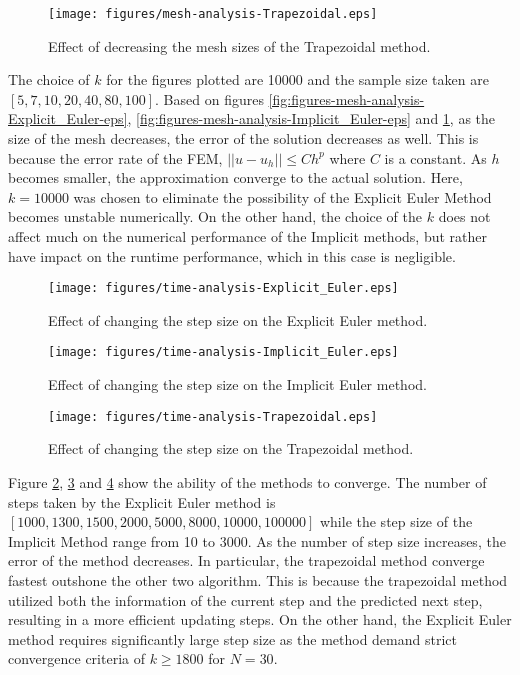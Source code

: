 \documentclass{article}
\begin{document}
\begin{figure}[H]
  \centering
  \texttt{[image: figures/mesh-analysis-Trapezoidal.eps]}
  \caption{Effect of decreasing the mesh sizes of the Trapezoidal method.}
  \label{fig:figures-mesh-analysis-Trapezoidal-eps}
\end{figure}
The choice of $k$ for the figures plotted are 10000 and the sample size taken are 
$[5, 7, 10, 20, 40, 80, 100]$. Based on figures \ref{fig:figures-mesh-analysis-Explicit_Euler-eps}, \ref{fig:figures-mesh-analysis-Implicit_Euler-eps} and \ref{fig:figures-mesh-analysis-Trapezoidal-eps},
as the size of the mesh decreases, the error of the solution decreases as well. This is because
the error rate of the FEM, $||u - u_h|| \le Ch^p$ where $C$ is a constant. As $h$ becomes 
smaller, the approximation converge to the actual solution. Here, $k=10000$ was chosen to 
eliminate the possibility of the Explicit Euler Method becomes unstable numerically. On the 
other hand, the choice of the $k$ does not affect much on the numerical performance of the 
Implicit methods, but rather have impact on the runtime performance, which in this case is 
negligible.



\begin{figure}[H]
  \centering
  \texttt{[image: figures/time-analysis-Explicit\_Euler.eps]}
  \caption{Effect of changing the step size on the Explicit Euler method.}
  \label{fig:figures-time-analysis-Explicit_Euler-eps}
\end{figure}

\begin{figure}[H]
  \centering
  \texttt{[image: figures/time-analysis-Implicit\_Euler.eps]}
  \caption{Effect of changing the step size on the Implicit Euler method.}
  \label{fig:figures-time-analysis-Implicit_Euler-eps}
\end{figure}

\begin{figure}[H]
  \centering
  \texttt{[image: figures/time-analysis-Trapezoidal.eps]}
  \caption{Effect of changing the step size on the Trapezoidal method.}
  \label{fig:figures-time-analysis-Trapezoidal-eps}
\end{figure}

Figure \ref{fig:figures-time-analysis-Explicit_Euler-eps}, \ref{fig:figures-time-analysis-Implicit_Euler-eps} and \ref{fig:figures-time-analysis-Trapezoidal-eps}
show the ability of the methods to converge. The number of steps taken by the Explicit Euler
method is $[1000, 1300, 1500, 2000, 5000, 8000, 10000, 100000]$ while the step size of the
Implicit Method range from 10 to 3000. As the number of step size increases, the error of the
method decreases. In particular, the trapezoidal method converge fastest outshone the other two
algorithm. This is because the trapezoidal method utilized both the information of the current
step and the predicted next step, resulting in a more efficient updating steps. On the other hand,
the Explicit Euler method requires significantly large step size as the method demand strict
convergence criteria of $k \ge 1800$ for $N = 30$.
\end{document}

